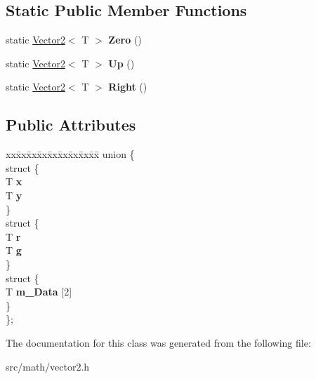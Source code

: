 \subsection*{Static Public Member Functions}
\begin{DoxyCompactItemize}
\item 
\mbox{\label{class_vector2_ad292daca1c030fbeca89f9f3d31c5440}} 
static \mbox{\hyperlink{class_vector2}{Vector2}}$<$ T $>$ {\bfseries Zero} ()
\item 
\mbox{\label{class_vector2_af04244aacaf2b078c861e59e0da4754f}} 
static \mbox{\hyperlink{class_vector2}{Vector2}}$<$ T $>$ {\bfseries Up} ()
\item 
\mbox{\label{class_vector2_af0fdeb0f5114670f894ff6477107a9d6}} 
static \mbox{\hyperlink{class_vector2}{Vector2}}$<$ T $>$ {\bfseries Right} ()
\end{DoxyCompactItemize}
\subsection*{Public Attributes}
\begin{DoxyCompactItemize}
\item 
\mbox{\label{class_vector2_af0286bd957105f1b6d507cf47f0861c4}} 
\begin{tabbing}
xx\=xx\=xx\=xx\=xx\=xx\=xx\=xx\=xx\=\kill
union \{\\
\mbox{\label{union_vector2_1_1_0D8_a91f006075278021fe10c79ca7ffb7d97}} 
\>struct \{\\
\>\>T {\bfseries x}\\
\>\>T {\bfseries y}\\
\>\} \\
\mbox{\label{union_vector2_1_1_0D8_a9d5ec7dd5b795fe126dbb8ab2b95a2e8}} 
\>struct \{\\
\>\>T {\bfseries r}\\
\>\>T {\bfseries g}\\
\>\} \\
\mbox{\label{union_vector2_1_1_0D8_af65e6267c7f3e2d4d78879fde486e0c9}} 
\>struct \{\\
\>\>T {\bfseries m\_Data} \mbox{[}2\mbox{]}\\
\>\} \\
\}; \\

\end{tabbing}\end{DoxyCompactItemize}


The documentation for this class was generated from the following file\+:\begin{DoxyCompactItemize}
\item 
src/math/vector2.\+h\end{DoxyCompactItemize}
